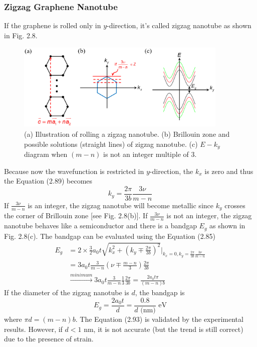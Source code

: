 \subsubsection{Zigzag Graphene Nanotube}
If the graphene is rolled only in $y$-direction, it's called zigzag nanotube as shown in Fig. 2.8.
\begin{figure}[tbp]
\includegraphics[width=0.9\textwidth]{figures/Fig2_8}
\centering
\caption{\small (a) Illustration of rolling a zigzag nanotube. (b) Brillouin zone and possible solutions (straight lines) of zigzag nanotube. (c) $E-k_{y}$ diagram when $(m-n)$ is not an integer multiple of 3.}
\end{figure} Because now the wavefunction is restricted in $y$-direction, the $k_{x}$ is zero and thus the Equation (2.89) becomes \begin{equation}
    k_{y} = \frac{2\pi}{3b}\frac{3\nu}{m-n}
\end{equation} If $\frac{3\nu}{m-n}$ is an integer, the zigzag nanotube will become metallic since $k_{y}$ crosses the corner of Brillouin zone [see Fig. 2.8(b)]. If $\frac{3\nu}{m-n}$ is not an integer, the zigzag nanotube behaves like a semiconductor and there is a bandgap $E_{g}$ as shown in Fig. 2.8(c). The bandgap can be evaluated using the Equation (2.85) \begin{align}
    E_{g}& = 2\times\frac{3}{2}a_{0}t\sqrt{k_{x}^{2}+\left(k_{y}\mp\frac{2\pi}{3b}\right)^{2}}\big|_{k_{x}=0,k_{y}=\frac{2\pi}{3b}\frac{3\nu}{m-n}}\nonumber\\
    & = 3a_{0}t\frac{3}{m-n}\left(\nu\mp\frac{m-n}{3}\right)\frac{2\pi}{3b}\nonumber\\
    &\xrightarrow{minimum} 3a_{0}t\frac{3}{m-n}\frac{1}{3}\frac{2\pi}{3b} = \frac{2a_{0}t\pi}{\left(m-n\right)b}
\end{align} If the diameter of the zigzag nanotube is $d$, the bandgap is \begin{equation}
    E_{g} = \frac{2a_{0}t}{d} = \frac{0.8}{d\text{ (nm)}}\text{ eV}
\end{equation} where $\pi d = (m-n)b$. The Equation (2.93) is validated by the experimental results. However, if $d<1$ nm, it is not accurate (but the trend is still correct) due to the presence of strain.
